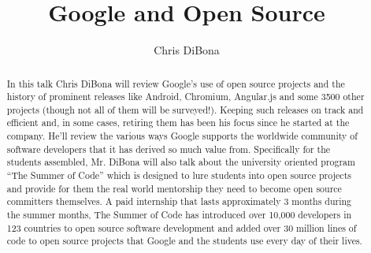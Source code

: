 \documentclass[a4paper,UKenglish]{oasics}
\title{Google and Open Source}
\author{Chris DiBona}
\affil{Google Inc.}
\begin{document}
\maketitle
\begin{abstract}
In this talk Chris DiBona will review Google’s use of open source projects and the history of prominent releases like Android, Chromium, Angular.js and some 3500 other projects (though not all of them will be surveyed!). 
Keeping such releases on track and efficient and, in some cases, retiring them has been his focus since he started at the company.
He’ll review the various ways Google supports the worldwide community of software developers that it has derived so much value from. 
Specifically for the students assembled, Mr. DiBona will also talk about the university oriented program “The Summer of Code” which is designed 
to lure students into open source projects and provide for them the real world mentorship they need to become open source committers themselves. 
A paid internship that lasts approximately 3 months during the summer months, The Summer of Code has introduced over 10,000 developers in 123
countries to open source software development and added over 30 million lines of code to open source 
projects that Google and the students use every day of their lives.
\end{abstract}
\end{document}
